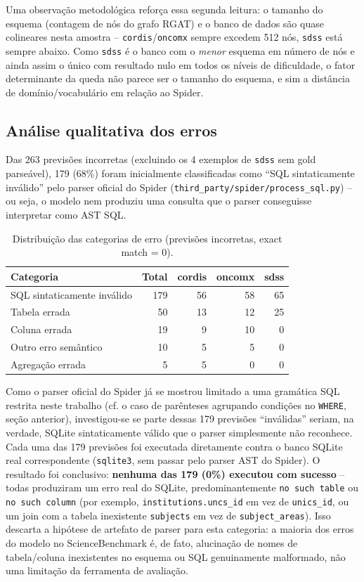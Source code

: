 Uma observação metodológica reforça essa segunda leitura: o tamanho do
esquema (contagem de nós do grafo RGAT) e o banco de dados são quase
colineares nesta amostra -- \texttt{cordis}/\texttt{oncomx} sempre excedem
512 nós, \texttt{sdss} está sempre abaixo. Como \texttt{sdss} é o banco com o
\emph{menor} esquema em número de nós e ainda assim o único com resultado
nulo em todos os níveis de dificuldade, o fator determinante da queda não
parece ser o tamanho do esquema, e sim a distância de domínio/vocabulário em
relação ao Spider.

\subsection{Análise qualitativa dos erros}

Das 263 previsões incorretas (excluindo os 4 exemplos de \texttt{sdss} sem
gold parseável), 179 (68\%) foram inicialmente classificadas como ``SQL
sintaticamente inválido'' pelo parser oficial do Spider
(\texttt{third\_party/spider/process\_sql.py}) -- ou seja, o modelo nem
produziu uma consulta que o parser conseguisse interpretar como AST SQL.

\begin{table}[h]
\centering
\caption{Distribuição das categorias de erro (previsões incorretas, exact match = 0).}
\label{tab:error-categories}
\begin{tabular}{lrrrr}
\toprule
\textbf{Categoria} & \textbf{Total} & \textbf{cordis} & \textbf{oncomx} & \textbf{sdss} \\
\midrule
SQL sintaticamente inválido & 179 & 56 & 58 & 65 \\
Tabela errada                & 50  & 13 & 12 & 25 \\
Coluna errada                 & 19  & 9  & 10 & 0  \\
Outro erro semântico          & 10  & 5  & 5  & 0  \\
Agregação errada              & 5   & 5  & 0  & 0  \\
\bottomrule
\end{tabular}
\end{table}

Como o parser oficial do Spider já se mostrou limitado a uma gramática SQL
restrita neste trabalho (cf. o caso de parênteses agrupando condições no
\texttt{WHERE}, seção anterior), investigou-se se parte dessas 179 previsões
``inválidas'' seriam, na verdade, SQLite sintaticamente válido que o parser
simplesmente não reconhece. Cada uma das 179 previsões foi executada
diretamente contra o banco SQLite real correspondente (\texttt{sqlite3},
sem passar pelo parser AST do Spider). O resultado foi conclusivo:
\textbf{nenhuma das 179 (0\%) executou com sucesso} -- todas produziram um
erro real do SQLite, predominantemente \texttt{no such table} ou
\texttt{no such column} (por exemplo, \texttt{institutions.uncs\_id} em vez
de \texttt{unics\_id}, ou um join com a tabela inexistente \texttt{subjects}
em vez de \texttt{subject\_areas}). Isso descarta a hipótese de artefato de
parser para esta categoria: a maioria dos erros do modelo no
ScienceBenchmark é, de fato, alucinação de nomes de tabela/coluna
inexistentes no esquema ou SQL genuinamente malformado, não uma limitação da
ferramenta de avaliação.

